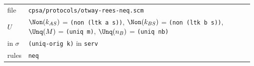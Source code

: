 \par\smallskip\noindent\begin{tabular}{@{}l p{}@{}}
file & \texttt{cpsa/protocols/otway-rees-neq.scm}\\
$U$ & $\Non(k_{AS})$ = \texttt{(non (ltk a s))}, $\Non(k_{BS})$ = \texttt{(non (ltk b s))}, $\Unq(M)$ = \texttt{(uniq m)}, $\Unq(n_B)$ = \texttt{(uniq nb)}\\
in $\sigma$ & \texttt{(uniq-orig k)} in \texttt{serv}\\
rules & \texttt{neq}\\
\end{tabular}

